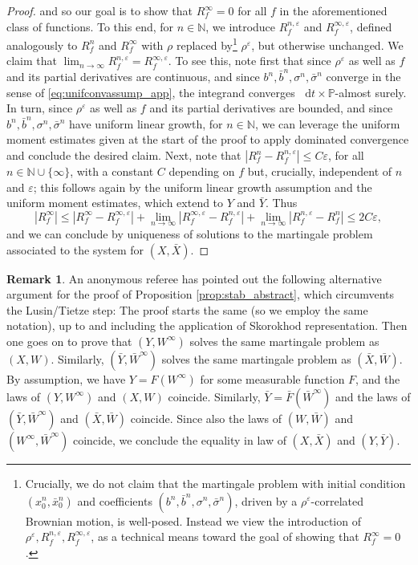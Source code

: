 \documentclass[oneside]{amsart}
\theoremstyle{definition}
\newtheorem{remark}[theorem]{Remark}
\newcommand{\N}{\mathbb N}
\newcommand{\D}{\mathop{}\!\mathrm{d}}
\numberwithin{equation}{section}
\begin{document}
\begin{proof}
and so our goal is to show that  $R_f^\infty=0$ for all $f$ in the aforementioned class of functions. To this end, for $n \in \N$, we introduce $R_f^{n,\varepsilon}$ and $R_f^{\infty,\varepsilon}$, defined analogously to $R_f^n$ and $R_f^\infty$  with $\rho$ replaced by\footnote{Crucially, we do not claim that the martingale problem with initial condition $(x^n_0, \bar x^n_0)$ and coefficients $(b^n,\bar b^n,\sigma^n,\bar\sigma^n)$, driven by a $\rho^\varepsilon$-correlated Brownian motion, is well-posed. Instead we view the introduction of $\rho^\varepsilon,R_f^{n,\varepsilon},R_f^{\infty,\varepsilon}$, as a technical means toward the goal of showing that $R_f^\infty=0$.} $\rho^\varepsilon$, but otherwise unchanged. We claim that $\lim_{n\to\infty} R_f^{n,\varepsilon} =  R_f^{\infty,\varepsilon}$. To see this, note first that since $\rho^\varepsilon$ as well as $f$ and its partial derivatives are continuous, and since $b^n,\bar b^n,\sigma^n,\bar\sigma^n$ converge in the sense of \eqref{eq:unifconvassump_app}, the integrand converges $\D t\times \mathbb P$-almost surely. In turn, since $\rho^\varepsilon$ as well as $f$ and its partial derivatives are bounded, and since $b^n,\bar b^n,\sigma^n,\bar\sigma^n$ have uniform linear growth, for $n \in \N$, we can leverage the uniform moment estimates given at the start of the proof to apply dominated convergence and conclude the desired claim. 
Next, note that $|R_f^{n} - R_f^{n,\varepsilon}|\leq C\varepsilon$, for all $n\in\mathbb N\cup\{\infty\}$, with a constant $C$ depending on $f$ but, crucially, independent of $n$ and $\varepsilon$; this follows again by the uniform linear growth assumption and the uniform moment estimates, which extend to $Y$ and $\bar Y$. Thus $$|R^\infty_f|\leq |R^\infty_f -R_f^{\infty,\varepsilon} | + \lim_{n \to \infty}|R_f^{\infty,\varepsilon} - R_f^{n,\varepsilon} | + \lim_{n \to \infty}|R_f^{n,\varepsilon} - R_f^n | \leq 2 C \varepsilon,$$ and we can conclude by uniqueness of solutions to the martingale problem associated to the system for $(X,\bar X)$.
\end{proof}

\begin{remark}
    An anonymous referee has pointed out the following alternative argument for the proof of Proposition \ref{prop:stab_abstract}, which circumvents the Lusin/Tietze step: The proof starts the same (so we employ the same notation), up to and including the application of Skorokhod representation. Then one goes on to prove that $(Y,W^\infty)$ solves the same martingale problem as $(X,W)$. Similarly, $(\bar Y,\bar W^\infty)$ solves the same martingale problem as $(\bar X,\bar W)$. By assumption, we have $ Y=F( W^\infty)$ for some measurable function $F$, and the laws of $(Y,W^\infty)$ and $(X,W)$ coincide. Similarly,   $ \bar Y=\bar F( \bar W^\infty)$ and the laws of $(\bar Y,\bar W^\infty)$ and $(\bar X,\bar W)$ coincide. Since also the laws of $(W,\bar W)$ and $(W^\infty,\bar W^ \infty)$ coincide, we conclude the equality in law of $(X,\bar X)$ and $(Y,\bar Y)$.
\end{remark}



\end{document}
